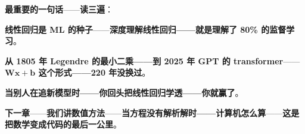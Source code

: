 \textbf{最重要的一句话}——\textbf{读三遍}：

\begin{tcolorbox}[colback=green!5, colframe=green!50!black]
\textbf{线性回归是 ML 的种子}——\textbf{深度理解线性回归——就是理解了 80\% 的监督学习}。

\textbf{从 1805 年 Legendre 的最小二乘——到 2025 年 GPT 的 transformer}——\textbf{$\mathbf{Wx} + \mathbf{b}$ 这个形式——220 年没换过}。

\textbf{当别人在追新模型时——你回头把线性回归学透——你就赢了}。
\end{tcolorbox}

\textbf{下一章}——\textbf{我们讲数值方法}——\textbf{当方程没有解析解时——计算机怎么算}——\textbf{这是把数学变成代码的最后一公里}。

\clearpage
